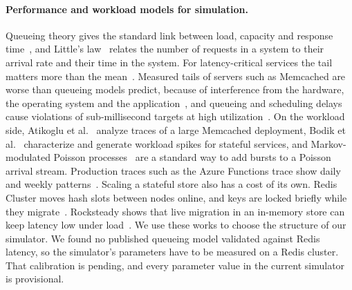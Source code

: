 \paragraph{Performance and workload models for simulation.}
Queueing theory gives the standard link between load, capacity and response time~\cite{harcholbalter2013performance},
and Little's law~\cite{little1961proof} relates the number of requests in a system to their arrival rate and their
time in the system. For latency-critical services the tail matters more than the mean~\cite{dean2013tail}.
Measured tails of servers such as Memcached are worse than queueing models predict, because of interference from the
hardware, the operating system and the application~\cite{li2014tales}, and queueing and scheduling delays cause
violations of sub-millisecond targets at high utilization~\cite{leverich2014reconciling}. On the workload side,
Atikoglu et al.~\cite{atikoglu2012workload} analyze traces of a large Memcached deployment, Bodik et
al.~\cite{bodik2010spikes} characterize and generate workload spikes for stateful services, and Markov-modulated
Poisson processes~\cite{fischer1993mmpp} are a standard way to add bursts to a Poisson arrival stream. Production
traces such as the Azure Functions trace show daily and weekly patterns~\cite{shahrad2020serverless}. Scaling a
stateful store also has a cost of its own. Redis Cluster moves hash slots between nodes online, and keys are
locked briefly while they migrate~\cite{redisdocs_scaling,redisdocs_clusterspec}. Rocksteady shows that live
migration in an in-memory store can keep latency low under load~\cite{kulkarni2017rocksteady}. We use these works
to choose the structure of our simulator. We found no published queueing model validated against Redis latency, so the simulator's parameters have to be
measured on a Redis cluster. That calibration is pending, and every parameter value in the current simulator is
provisional.

